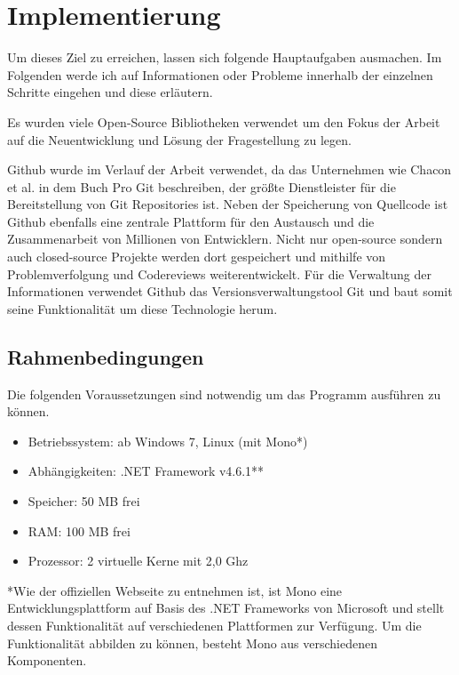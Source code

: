 \chapter{Implementierung}

Um dieses Ziel zu erreichen, lassen sich folgende Hauptaufgaben ausmachen. Im Folgenden werde ich auf Informationen oder Probleme innerhalb der einzelnen Schritte eingehen und diese erläutern.

Es wurden viele Open-Source Bibliotheken verwendet um den Fokus der Arbeit auf die Neuentwicklung und Lösung der Fragestellung zu legen.

Github wurde im Verlauf der Arbeit verwendet, da das Unternehmen wie Chacon et al. in dem Buch Pro Git \cite{Chacon2014} beschreiben, der größte Dienstleister für die Bereitstellung von Git Repositories ist. Neben der Speicherung von Quellcode ist Github ebenfalls eine zentrale Plattform für den Austausch und die Zusammenarbeit von Millionen von Entwicklern. Nicht nur open-source sondern auch closed-source Projekte werden dort gespeichert und mithilfe von Problemverfolgung und Codereviews weiterentwickelt. Für die Verwaltung der Informationen verwendet Github das Versionsverwaltungstool Git und baut somit seine Funktionalität um diese Technologie herum.
    
\section{Rahmenbedingungen}
    Die folgenden Voraussetzungen sind notwendig um das Programm ausführen zu können.
    \begin{itemize}
        \item Betriebssystem: ab Windows 7, Linux (mit Mono*)
        \item Abhängigkeiten: .NET Framework v4.6.1**
        \item Speicher: 50 MB frei
        \item RAM: 100 MB frei
        \item Prozessor: 2 virtuelle Kerne  mit 2,0 Ghz
    \end{itemize}
    
    *Wie der offiziellen Webseite \cite{mono_project_2018} zu entnehmen ist, ist Mono eine Entwicklungsplattform auf Basis des .NET Frameworks von Microsoft und stellt dessen Funktionalität auf verschiedenen Plattformen zur Verfügung. Um die Funktionalität abbilden zu können, besteht Mono aus verschiedenen Komponenten.
    
